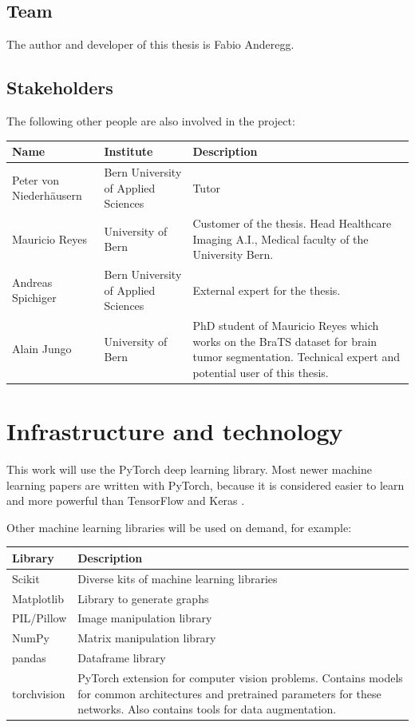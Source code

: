     \subsection{Team}
    The author and developer of this thesis is Fabio Anderegg.
    
    \subsection{Stakeholders}
    The following other people are also involved in the project:
    
    \begin{tabular}{| p{4cm} | p{3.5cm} | p{8cm} |}
        \hline
        \textbf{Name} & \textbf{Institute} & \textbf{Description} \\ \hline
        Peter von Niederhäusern & Bern University of Applied Sciences & Tutor \\ \hline
        Mauricio Reyes & University of Bern & Customer of the thesis. 
        Head Healthcare Imaging A.I., Medical faculty of the University Bern. \\ \hline
        Andreas Spichiger & Bern University of Applied Sciences & External expert for the thesis. \\ \hline
        Alain Jungo & University of Bern & PhD student of Mauricio Reyes which works on the BraTS dataset for brain tumor segmentation. Technical expert and potential user of this thesis. \\ \hline
    \end{tabular}

\section{Infrastructure and technology}
This work will use the PyTorch \cite{paszke2017automatic} deep learning library. Most newer machine learning papers are written with PyTorch, because it is considered easier to learn and more powerful than TensorFlow and Keras \cite{pytorchvstensorflow}.

Other machine learning libraries will be used on demand, for example:

\begin{tabular}{|p{3cm}|p{12.5cm}|}
    \hline
    \textbf{Library} & \textbf{Description} \\ \hline
    Scikit & Diverse kits of machine learning libraries \\ \hline
    Matplotlib & Library to generate graphs \\ \hline
    PIL/Pillow & Image manipulation library \\ \hline
    NumPy & Matrix manipulation library \\ \hline
    pandas & Dataframe library \\ \hline
    torchvision & PyTorch extension for computer vision problems. Contains models for common architectures and pretrained parameters for these networks. Also contains tools for data augmentation. \\ \hline
\end{tabular}

